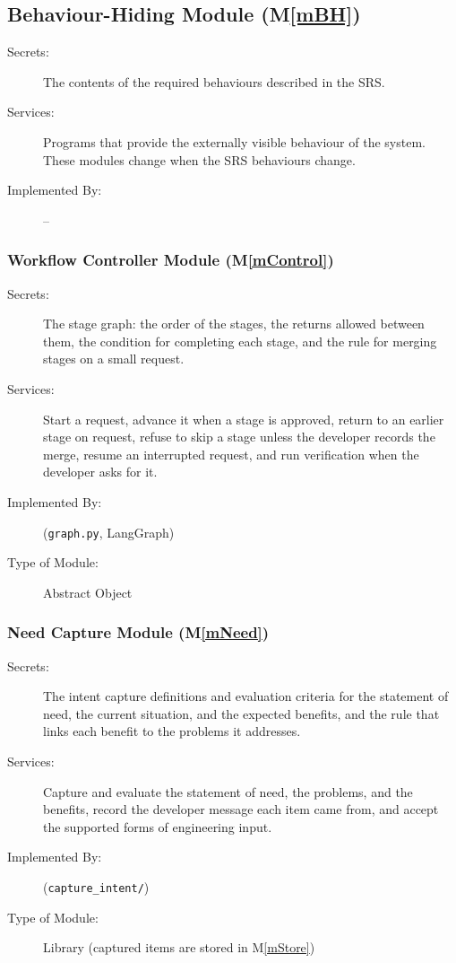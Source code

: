 \documentclass[12pt, titlepage]{article}
\newcommand{\mref}[1]{M\ref{#1}}
\begin{document}
\subsection{Behaviour-Hiding Module (\mref{mBH})}

\begin{description}
\item[Secrets:]The contents of the required behaviours described in the SRS.
\item[Services:]Programs that provide the externally visible behaviour of the
  system. These modules change when the SRS behaviours change.
\item[Implemented By:] --
\end{description}

\subsubsection{Workflow Controller Module (\mref{mControl})}

\begin{description}
\item[Secrets:]The stage graph: the order of the stages, the returns allowed
  between them, the condition for completing each stage, and the rule for
  merging stages on a small request.
\item[Services:]Start a request, advance it when a stage is approved, return to
  an earlier stage on request, refuse to skip a stage unless the developer
  records the merge, resume an interrupted request, and run verification when
  the developer asks for it.
\item[Implemented By:] \progname{} (\texttt{graph.py}, LangGraph)
\item[Type of Module:] Abstract Object
\end{description}

\subsubsection{Need Capture Module (\mref{mNeed})}

\begin{description}
\item[Secrets:]The intent capture definitions and evaluation criteria for
  the statement of need, the current situation, and the expected benefits, and
  the rule that links each benefit to the problems it addresses.
\item[Services:]Capture and evaluate the statement of need, the problems, and
  the benefits, record the developer message each item came from, and accept
  the supported forms of engineering input.
\item[Implemented By:] \progname{} (\texttt{capture\_intent/})
\item[Type of Module:] Library (captured items are stored in \mref{mStore})
\end{description}
\end{document}
